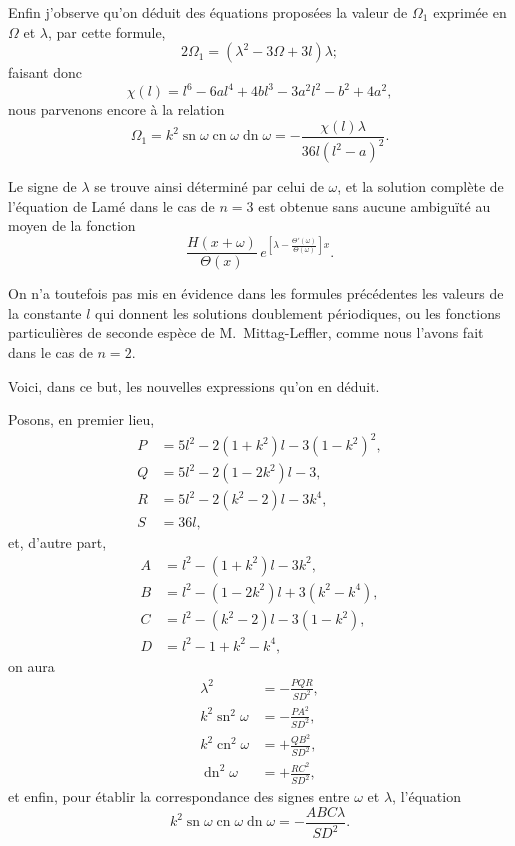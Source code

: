 \documentclass[11pt,leqno,oneside,letterpaper]{book}[2005/09/16]
\DeclareMathOperator{\sn}{sn}
\DeclareMathOperator{\cn}{cn}
\DeclareMathOperator{\dn}{dn}
\begin{document}
Enfin j'observe qu'on d\'eduit des \'equations propos\'ees la valeur de $\Omega_1$
exprim\'ee en $\Omega$ et $\lambda$, par cette formule,
\[
2\Omega_1 = (\lambda^2 - 3\Omega + 3l) \lambda;
\]
faisant donc
\[
\chi(l) = l^6 - 6al^4 + 4bl^3 - 3a^2l^2 - b^2 + 4a^2,
\]
nous parvenons encore \`a la relation
\[
\Omega_1 = k^2 \sn \omega \cn \omega \dn \omega = -\frac{\chi(l)\lambda}{36l(l^2-a)^2}.
\]

Le signe de $\lambda$ se trouve ainsi d\'etermin\'e par celui de $\omega$, et la solution
compl\`ete de l'\'equation de Lam\'e dans le cas de $n = 3$ est obtenue sans
aucune ambigu\"it\'e au moyen de la fonction
\[
\frac{H(x + \omega)}{\Theta(x)}\,
  e^{ \left[ \lambda - \frac{\Theta'(\omega)}{\Theta(\omega)} \right] x}.
\]

On n'a toutefois pas mis en \'evidence dans les formules pr\'ec\'edentes les
valeurs de la constante $l$ qui donnent les solutions doublement p\'eriodiques,
ou les fonctions particuli\`eres de seconde esp\`ece de M.~Mittag-Leffler,
comme nous l'avons fait dans le cas de $n = 2$.

Voici, dans ce but, les nouvelles expressions qu'on en d\'eduit.

Posons, en premier lieu,
\begin{align*}
P &= 5l^2 - 2(1+k^2)l - 3(1-k^2)^2, \\
Q &= 5l^2 - 2(1-2k^2)l - 3,\\
R &= 5l^2 - 2(k^2-2)l - 3k^4,\\
S &= 36l,
\end{align*}
et, d'autre part,
\begin{align*}
A &= l^2 - (1+k^2)l - 3k^2,\\
B &= l^2 - (1-2k^2)l + 3(k^2-k^4),\\
C &= l^2 - (k^2-2)l - 3(1-k^2),\\
D &= l^2 - 1 + k^2 - k^4,
\end{align*}
on aura
\begin{align*}
\lambda^2        &= -\frac{PQR}{SD^2},  \\
k^2 \sn^2 \omega &= -\frac{PA^2}{SD^2}, \\
k^2 \cn^2 \omega &= +\frac{QB^2}{SD^2}, \\
\dn^2 \omega     &= +\frac{RC^2}{SD^2},
\end{align*}
et enfin, pour \'etablir la correspondance des signes entre $\omega$ et $\lambda$, l'\'equation
\[
k^2 \sn \omega \cn \omega \dn \omega = -\frac{ABC \lambda}{SD^2}.
\]
\end{document}
